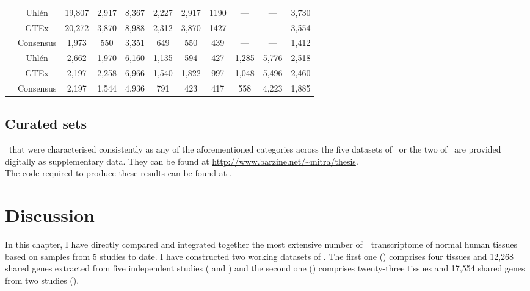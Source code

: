 \begin{landscape}
\begin{table}[]
\begin{tabular}{@{}ccccccccccc@{}}
& Uhlén & 19,807 & 2,917 & 8,367 & 2,227 &
2,917  & 1190  & --- & --- & 3,730  \\
& GTEx & 20,272 & 3,870 & 8,988  & 2,312 &
3,870  & 1427  & --- & --- & 3,554  \\
\cmidrule(l){2-11}
& Consensus & 1,973 & 550 & 3,351 & 649 &
550  & 439 & --- & --- & 1,412  \\
\midrule
\multirow{3}{*}{\rotatebox[origin=c]{90}{\parbox[c]{1.7cm}{\centering Common\\ 23
tissues\\ Working datasets}}} & Uhlén & 2,662  & 1,970  &
6,160 & 1,135 & 594  & 427 & 1,285 &
5,776 & 2,518 \\
& GTEx & 2,197 & 2,258 & 6,966  & 1,540 &
1,822  & 997 & 1,048 & 5,496  & 2,460 \\
\cmidrule(l){2-11}
& Consensus & 2,197 & 1,544 & 4,936 & 791 &
423 & 417 & 558 & 4,223 & 1,885 \\
\bottomrule
\end{tabular}
\end{table}
\end{landscape}
\pagestyle{scrheadings}


\subsection{Curated sets}\label{subsec:Trans_curatedSets}
\vspace{-6mm}
\Pcgs\ that were characterised consistently
as any of the aforementioned categories across the five datasets of \setOne\
or the two of \setTwo\
are provided digitally as supplementary data.
They can be found at \url{http://www.barzine.net/~mitra/thesis}.
\\The code required to produce these results can be found at \github.\mybr\

\vspace{-1.5mm}
\section{Discussion}\label{sec:Trans_discussion}
In this chapter,
I have directly compared and integrated together
the most extensive number of~\Rnaseq\ transcriptome
of normal human tissues based on samples from 5 studies to date.
I have constructed two working datasets of \pcgs.
The first one (\setOne) comprises four tissues
and 12,268 shared genes
extracted from five independent studies
(\cite{Krupp2012,VTpaper,Uhlen2015,GTExTranscript} and \ibm)
and the second one (\setTwo) comprises twenty-three tissues
and 17,554 shared genes
from two studies (\cite{Uhlen2015,GTExTranscript}).\mybr\

